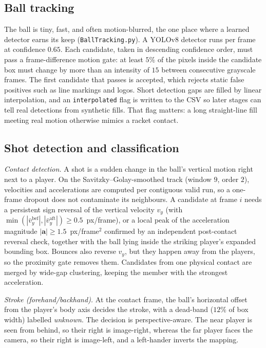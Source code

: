 \documentclass[11pt]{article}
\begin{document}
\subsection{Ball tracking}
The ball is tiny, fast, and often motion-blurred, the one place where a learned detector earns its keep (\texttt{BallTracking.py}). A YOLOv8 detector runs per frame at confidence $0.65$. Each candidate, taken in descending confidence order, must pass a frame-difference motion gate: at least $5\%$ of the pixels inside the candidate box must change by more than an intensity of $15$ between consecutive grayscale frames. The first candidate that passes is accepted, which rejects static false positives such as line markings and logos. Short detection gaps are filled by linear interpolation, and an \texttt{interpolated} flag is written to the CSV so later stages can tell real detections from synthetic fills. That flag matters: a long straight-line fill meeting real motion otherwise mimics a racket contact.

\subsection{Shot detection and classification}
\textit{Contact detection.} A shot is a sudden change in the ball's vertical motion right next to a player. On the Savitzky--Golay-smoothed track (window $9$, order $2$), velocities and accelerations are computed per contiguous valid run, so a one-frame dropout does not contaminate its neighbours. A candidate at frame $i$ needs a persistent sign reversal of the vertical velocity $v_y$ (with $\min(|\bar v_y^{\text{bef}}|,|\bar v_y^{\text{aft}}|)\ge 0.5$~px/frame), or a local peak of the acceleration magnitude $|\mathbf{a}|\ge 1.5$~px/frame$^2$ confirmed by an independent post-contact reversal check, together with the ball lying inside the striking player's expanded bounding box. Bounces also reverse $v_y$, but they happen away from the players, so the proximity gate removes them. Candidates from one physical contact are merged by wide-gap clustering, keeping the member with the strongest acceleration.

\textit{Stroke (forehand/backhand).} At the contact frame, the ball's horizontal offset from the player's body axis decides the stroke, with a dead-band ($12\%$ of box width) labelled \emph{unknown}. The decision is perspective-aware. The near player is seen from behind, so their right is image-right, whereas the far player faces the camera, so their right is image-left, and a left-hander inverts the mapping.
\end{document}
